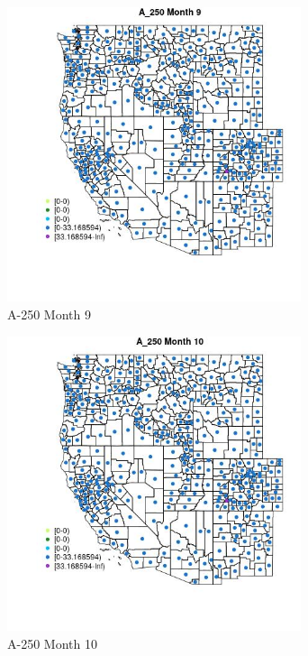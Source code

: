 \begin{figure} 
\centering  
\includegraphics[width=0.77\textwidth]{Code_Outputs/df_report_ML_predictors_CountyCentroid_Locations_Dates_2008-01-01to2018-12-31_MapObsMo9A_250.jpg} 
\caption{\label{fig:df_report_ML_predictors_CountyCentroid_Locations_Dates_2008-01-01to2018-12-31MapObsMo9A_250}A-250 Month 9} 
\end{figure} 
 

\begin{figure} 
\centering  
\includegraphics[width=0.77\textwidth]{Code_Outputs/df_report_ML_predictors_CountyCentroid_Locations_Dates_2008-01-01to2018-12-31_MapObsMo10A_250.jpg} 
\caption{\label{fig:df_report_ML_predictors_CountyCentroid_Locations_Dates_2008-01-01to2018-12-31MapObsMo10A_250}A-250 Month 10} 
\end{figure} 
 

